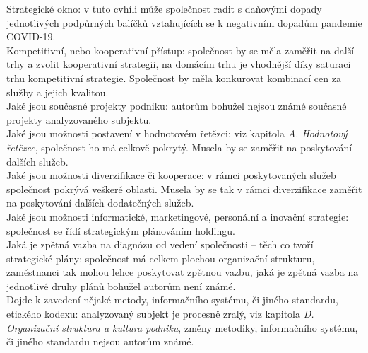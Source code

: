 Strategické okno: v tuto cvhíli může společnost radit s daňovými dopady jednotlivých podpůrných balíčků vztahujících se k negativním dopadům pandemie COVID-19.\\

Kompetitivní, nebo kooperativní přístup: společnost by se měla zaměřit na další trhy a zvolit kooperativní strategii, na domácím trhu je vhodnější díky saturaci trhu kompetitivní strategie. Společnost by měla konkurovat kombinací cen za služby a jejich kvalitou.\\

Jaké jsou současné projekty podniku: autorům bohužel nejsou známé současné projekty analyzovaného subjektu.\\

Jaké jsou možnosti postavení v hodnotovém řetězci: viz kapitola \textit{A. Hodnotový řetězec}, společnost ho má celkově pokrytý. Musela by se zaměřit na poskytování dalších služeb.\\

Jaké jsou možnosti diverzifikace či kooperace: v rámci poskytovaných služeb společnost pokrývá veškeré oblasti. Musela by se tak v rámci diverzifikace zaměřit na poskytování dalších dodatečných služeb.\\

Jaké jsou možnosti informatické, marketingové, personální a inovační strategie: společnost se řídí strategickým plánováním holdingu.\\

Jaká je zpětná vazba na diagnózu od vedení společnosti – těch co tvoří strategické plány: společnost má celkem plochou organizační strukturu, zaměstnanci tak mohou lehce poskytovat zpětnou vazbu, jaká je zpětná vazba na jednotlivé druhy plánů bohužel autorům není známé.\\

Dojde k zavedení nějaké metody, informačního systému, či jiného standardu, etického kodexu: analyzovaný subjekt je procesně zralý, viz kapitola \textit{D. Organizační struktura a kultura podniku}, změny metodiky, informačního systému, či jiného standardu nejsou autorům známé.\\